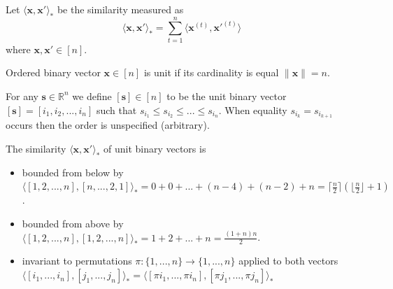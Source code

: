 \documentclass[oneside,english,logo]{amuthesis}
\begin{document}
\begin{definition}
Let $\langle \boldsymbol{x},\boldsymbol{x}' \rangle_*$ be the similarity measured as
\[
\langle \boldsymbol{x},\boldsymbol{x}' \rangle_* = \sum_{t=1}^{n} \langle \boldsymbol{x}^{(t)},\boldsymbol{x}'^{(t)} \rangle
\]
where $\boldsymbol{x},\boldsymbol{x}' \in [n]$. 
\end{definition}
\begin{definition}
Ordered binary vector $\boldsymbol{x}\in [n]$ is unit if its cardinality is equal $\lVert \boldsymbol{x} \rVert=n$.  
\end{definition}
\begin{definition}
For any $\boldsymbol{s}\in \mathbb{R}^n$ we define $[\boldsymbol{s}]\in [n]$ to be the unit binary vector $[\boldsymbol{s}]=[i_1,i_2,...,i_n]$ such that $s_{i_1} \le s_{i_2} \le ... \le s_{i_n}$. When equality $s_{i_k}=s_{i_{k+1}}$ occurs then the order is unspecified (arbitrary).   
\end{definition}
\begin{lemma}
The similarity $\langle \boldsymbol{x},\boldsymbol{x}' \rangle_*$ of unit binary vectors is 
\begin{itemize}
	\item bounded from below by $\langle [1,2,...,n],[n,...,2,1] \rangle_* = 0+0+...+(n-4)+(n-2)+n=\lceil \frac{n}{2} \rceil  (\lfloor \frac{n}{2} \rfloor + 1)$.
	\item bounded from above by $\langle [1,2,...,n],[1,2,...,n] \rangle_* = 1+2+...+n = \frac{(1+n)n}{2}$.
	\item invariant to permutations $\pi:\{1,...,n\}\rightarrow \{1,...,n\}$ applied to both vectors 
	$\langle [i_1,...,i_n],[j_1,...,j_n] \rangle_*=\langle [\pi i_1,...,\pi i_n],[\pi j_1,...,\pi j_n] \rangle_*$ 
\end{itemize}
\end{lemma}
\end{document}
